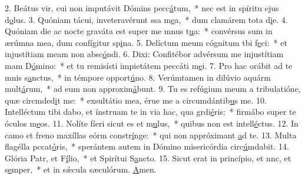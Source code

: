 2. Beátus vir, cui non imputávit Dómins pecc\uline{á}tum,~* nec est in spíritu ejus d\uline{o}lus.
3. Quóniam tácui, inveteravérunt ssa m\uline{e}a,~* dum clamárem tota d\uline{i}e.
4. Quóniam die ac nocte graváta est super me mnus t\uline{u}a:~* convérsus sum in ærúmna mea, dum confígitur sp\uline{i}na.
5. Delíctum meum cógnitum tbi f\uline{e}ci:~* et injustítiam meam non absc\uline{ó}ndi.
6. Dixi: Confitébor advérsum me injustítiam mam D\uline{ó}mino:~* et tu remisísti impietátem peccáti m\uline{e}i.
7. Pro hac orábit ad te mnis s\uline{a}nctus,~* in témpore opport\uline{ú}no.
8. Verúmtamen in dilúvio aquárm mult\uline{á}rum,~* ad eum non approxim\uline{á}bunt.
9. Tu es refúgium meum a tribulatióne, quæ circmded\uline{i}t me:~* exsultátio mea, érue me a circumdántib\uline{u}s me.
10. Intelléctum tibi dabo, et ínstruam te in via hac, qua grdi\uline{é}ris:~* firmábo super te óculos m\uline{e}os.
11. Nolíte fíeri sicut es et m\uline{u}lus,~* quibus non est intell\uline{é}ctus.
12. In camo et freno maxíllas eórm constr\uline{í}nge:~* qui non appróximant \uline{a}d te.
13. Multa flagélla pccat\uline{ó}ris,~* sperántem autem in Dómino misericórdia circ\uline{ú}mdabit.
14. Glória Patr, et F\uline{í}lio,~* et Spirítui S\uline{a}ncto.
15. Sicut erat in princípio, et nnc, et s\uline{e}mper,~* et in sǽcula sæculórum. \uline{A}men.
